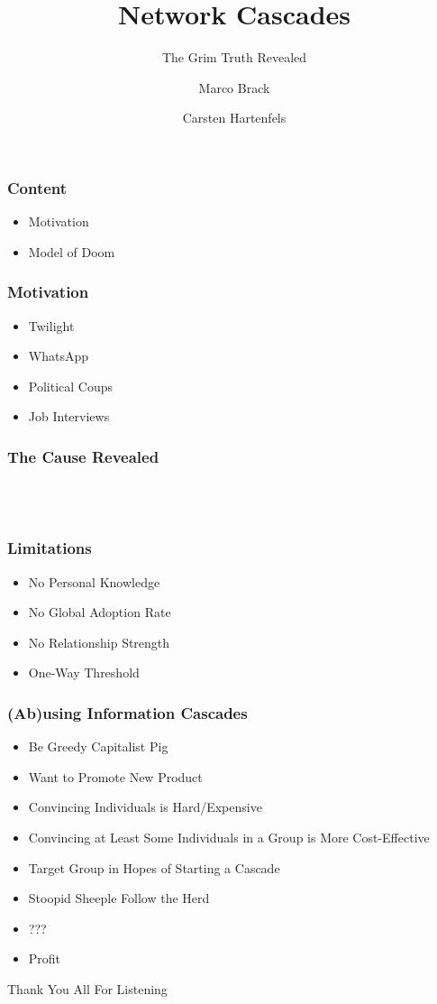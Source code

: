 \documentclass[slidestop,usenames,dvipsnames]{beamer}
\title{Network Cascades}
\subtitle{The Grim Truth Revealed}
\author{Marco Brack \and Carsten Hartenfels}
\newcommand{\fitem}{\pause\vfill\item}
\newcommand{\gitem}{\vfill\item}
\begin{document}
\begin{frame}
    \titlepage
\end{frame}




\begin{frame}
    \frametitle{Content}
    \begin{itemize}
        \gitem Motivation
        \gitem Model of Doom
    \end{itemize}
    \vfill
\end{frame}


\begin{frame}
    \frametitle{Motivation}
    \begin{itemize}
        \fitem Twilight
        \fitem WhatsApp
        \fitem Political Coups
        \fitem Job Interviews
    \end{itemize}
    \vfill
\end{frame}

\begin{frame}
    \frametitle{The Cause Revealed}
    \vfill
    \begin{center}
        \\
        \vspace{20pt}
        \\
        \vspace{20pt}
    \end{center}
    \vfill
\end{frame}



\begin{frame}
    \frametitle{Limitations}
    \begin{itemize}
        \fitem No Personal Knowledge
        \fitem No Global Adoption Rate
        \fitem No Relationship Strength
        \fitem One-Way Threshold
    \end{itemize}
    \vfill
\end{frame}

\begin{frame}
    \frametitle{(Ab)using Information Cascades}
    \begin{itemize}
        \fitem Be Greedy Capitalist Pig
        \fitem Want to Promote New Product
        \fitem Convincing Individuals is Hard/Expensive
        \fitem Convincing at Least Some Individuals in a Group is More Cost-Effective
        \fitem Target Group in Hopes of Starting a Cascade
        \fitem Stoopid Sheeple Follow the Herd
        \fitem ???
        \fitem Profit
    \end{itemize}
    \vfill
\end{frame}




\begin{frame}
    \vfill
    \begin{center}
        {\Huge Thank You All For Listening}\
    \end{center}
\end{frame}
\end{document}
